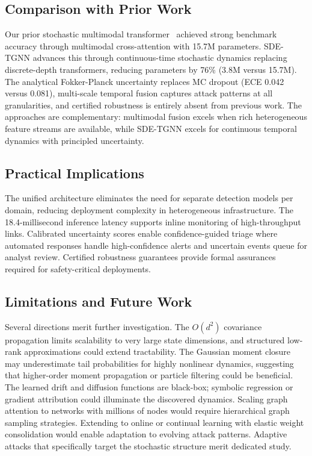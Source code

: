 \documentclass[journal]{IEEEtran}
\begin{document}
\subsection{Comparison with Prior Work}

Our prior stochastic multimodal transformer~\cite{anaedevha2026stochastic} achieved strong benchmark accuracy through multimodal cross-attention with 15.7M parameters. SDE-TGNN advances this through continuous-time stochastic dynamics replacing discrete-depth transformers, reducing parameters by 76\% (3.8M versus 15.7M). The analytical Fokker-Planck uncertainty replaces MC dropout (ECE 0.042 versus 0.081), multi-scale temporal fusion captures attack patterns at all granularities, and certified robustness is entirely absent from previous work. The approaches are complementary: multimodal fusion excels when rich heterogeneous feature streams are available, while SDE-TGNN excels for continuous temporal dynamics with principled uncertainty.


\subsection{Practical Implications}

The unified architecture eliminates the need for separate detection models per domain, reducing deployment complexity in heterogeneous infrastructure. The 18.4-millisecond inference latency supports inline monitoring of high-throughput links. Calibrated uncertainty scores enable confidence-guided triage where automated responses handle high-confidence alerts and uncertain events queue for analyst review. Certified robustness guarantees provide formal assurances required for safety-critical deployments.


\subsection{Limitations and Future Work}

Several directions merit further investigation. The $O(d^2)$ covariance propagation limits scalability to very large state dimensions, and structured low-rank approximations could extend tractability. The Gaussian moment closure may underestimate tail probabilities for highly nonlinear dynamics, suggesting that higher-order moment propagation or particle filtering could be beneficial. The learned drift and diffusion functions are black-box; symbolic regression or gradient attribution could illuminate the discovered dynamics. Scaling graph attention to networks with millions of nodes would require hierarchical graph sampling strategies. Extending to online or continual learning with elastic weight consolidation would enable adaptation to evolving attack patterns. Adaptive attacks that specifically target the stochastic structure merit dedicated study.
\end{document}
